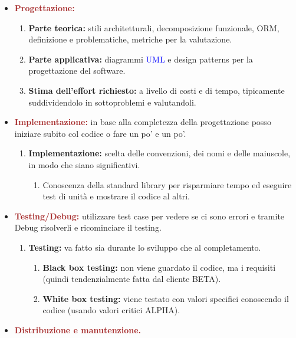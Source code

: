 \begin{itemize}
\begin{enumerate}
    \end{enumerate}
    \item \textbf{\textcolor{brown}{Progettazione:}}
    \begin{enumerate}
        \item \textbf{Parte teorica:} stili architetturali, decomposizione funzionale, ORM, definizione e problematiche, metriche per la valutazione.
        \item \textbf{Parte applicativa:} diagrammi \textcolor{blue}{UML} e design patterns per la progettazione del software.
        \item \textbf{Stima dell'effort richiesto:} a livello di costi e di tempo, tipicamente suddividendolo in sottoproblemi e valutandoli.
    \end{enumerate}
    \item \textbf{\textcolor{brown}{Implementazione:}} in base alla completezza della progettazione posso iniziare subito col codice o fare un po' e un po'.
    \begin{enumerate}
        \item \textbf{Implementazione:} scelta delle convenzioni, dei nomi e delle maiuscole, in modo che siano significativi.
        \begin{enumerate}
            \item Conoscenza della standard library per risparmiare tempo ed eseguire test di unità e mostrare il codice al altri.
        \end{enumerate}
    \end{enumerate}
    \item \textbf{\textcolor{brown}{Testing/Debug:}} utilizzare test case per vedere se ci sono errori e tramite Debug risolverli e ricominciare il testing.
    \begin{enumerate}
        \item \textbf{Testing:} va fatto sia durante lo sviluppo che al completamento.
        \begin{enumerate}
            \item \textbf{Black box testing:} non viene guardato il codice, ma i requisiti (quindi tendenzialmente fatta dal cliente BETA).
            \item \textbf{White box testing:} viene testato con valori specifici conoscendo il codice (usando valori critici ALPHA).
        \end{enumerate}
    \end{enumerate}
    \item \textbf{\textcolor{brown}{Distribuzione e manutenzione.}}
\end{itemize}
